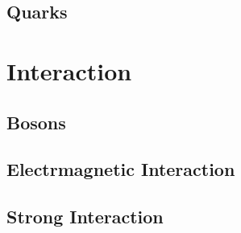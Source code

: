 % 
% 
% 
% 
% 

\subsection{Quarks}\label{sec:quark}


\section{Interaction}
\subsection{Bosons}
\subsection{Electrmagnetic Interaction}
\subsection{Strong Interaction}
